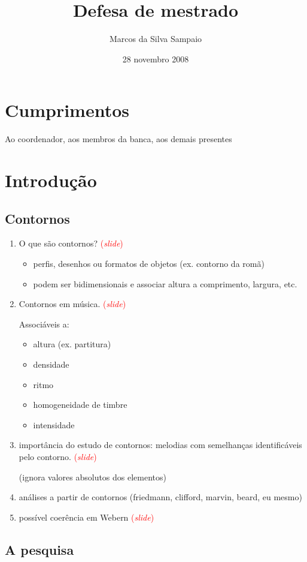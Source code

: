 \documentclass[12pt,a4paper]{article}
\title{Defesa de mestrado}
\author{Marcos da Silva Sampaio}
\date{28 novembro 2008}
\newcommand{\slide}{\textcolor{red}{(\textit{slide})}}
\begin{document}
\maketitle
\thispagestyle{empty}

\section*{Cumprimentos}

Ao coordenador, aos membros da banca, aos demais presentes

\section{Introdução}

\subsection{Contornos}

\begin{enumerate}
\item O que são contornos? \slide{}
  \begin{itemize}
  \item perfis, desenhos ou formatos de objetos (ex. contorno da romã)
  \item podem ser bidimensionais e associar altura a comprimento,
    largura, etc.
  \end{itemize}
\item Contornos em música. \slide{}

  Associáveis a:
  \begin{itemize}
  \item altura (ex. partitura)
  \item densidade
  \item ritmo
  \item homogeneidade de timbre
  \item intensidade
  \end{itemize}
\item importância do estudo de contornos: melodias com semelhanças
  identificáveis pelo contorno. \slide{}

  (ignora valores absolutos dos elementos)
\item análises a partir de contornos (friedmann, clifford, marvin, beard, eu mesmo)
\item possível coerência em Webern \slide{}
\end{enumerate}

\subsection{A pesquisa}
\end{document}
